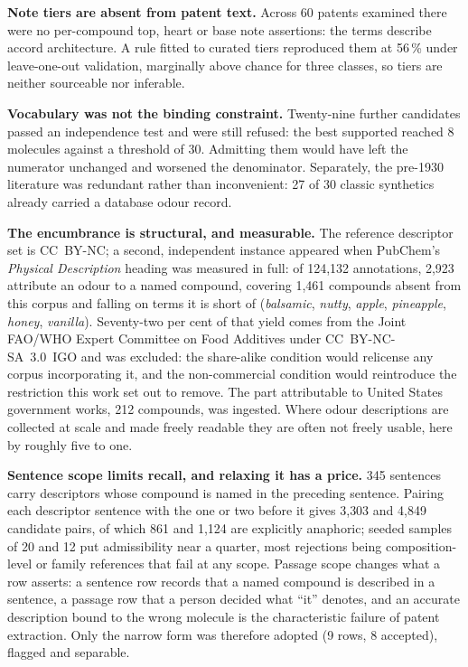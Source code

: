 \documentclass[
  computerscience
]{genesisl1-paper}
\begin{document}
\textbf{Note tiers are absent from patent text.} Across 60 patents examined there were no
per-compound top, heart or base note assertions: the terms describe accord architecture.
A rule fitted to curated tiers reproduced them at 56\,\% under leave-one-out validation,
marginally above chance for three classes, so tiers are neither sourceable nor inferable.

\textbf{Vocabulary was not the binding constraint.} Twenty-nine further candidates passed
an independence test and were still refused: the best supported reached 8 molecules
against a threshold of 30. Admitting them would have left the numerator unchanged and
worsened the denominator. Separately, the pre-1930 literature was redundant rather than
inconvenient: 27 of 30 classic synthetics already carried a database odour record.

\textbf{The encumbrance is structural, and measurable.} The reference descriptor set is
CC~BY-NC; a second, independent instance appeared when PubChem's \emph{Physical
Description} heading was measured in full: of 124{,}132 annotations, 2{,}923 attribute an
odour to a named compound, covering 1{,}461 compounds absent from this corpus and falling
on terms it is short of (\emph{balsamic}, \emph{nutty}, \emph{apple}, \emph{pineapple},
\emph{honey}, \emph{vanilla}). Seventy-two per cent of that yield comes from the Joint
FAO/WHO Expert Committee on Food Additives under CC~BY-NC-SA~3.0~IGO and was excluded: the
share-alike condition would relicense any corpus incorporating it, and the
non-commercial condition would reintroduce the restriction this work set out to remove.
The part attributable to United States government works, 212 compounds, was ingested.
Where odour descriptions are collected at scale and made freely readable they are often
not freely usable, here by roughly five to one.

\textbf{Sentence scope limits recall, and relaxing it has a price.} 345 sentences carry
descriptors whose compound is named in the preceding sentence. Pairing each descriptor
sentence with the one or two before it gives 3{,}303 and 4{,}849 candidate pairs, of which
861 and 1{,}124 are explicitly anaphoric; seeded samples of 20 and 12 put admissibility
near a quarter, most rejections being composition-level or family references that fail at
any scope. Passage scope changes what a row asserts: a sentence row records that a named
compound is described in a sentence, a passage row that a person decided what ``it''
denotes, and an accurate description bound to the wrong molecule is the characteristic
failure of patent extraction. Only the narrow form was therefore adopted (9 rows, 8
accepted), flagged and separable.
\end{document}
